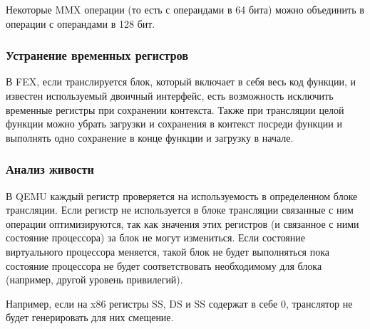 Некоторые MMX операции (то есть с операндами в 64 бита) можно объединить в операции с операндами в 128 бит.

\subsubsection{Устранение временных регистров}

В FEX, если транслируется блок, который включает в себя весь код функции, и известен используемый двоичный интерфейс, есть возможность исключить временные регистры при сохранении контекста. Также при трансляции целой функции можно убрать загрузки и сохранения в контекст посреди функции и выполнять одно сохранение в конце функции и загрузку в начале.

\subsubsection{Анализ живости}

В QEMU каждый регистр проверяется на используемость в определенном блоке трансляции. Если регистр не используется в блоке трансляции связанные с ним операции оптимизируются, так как значения этих регистров (и связанное с ними состояние процессора) за блок не могут измениться. Если состояние виртуального процессора меняется, такой блок не будет выполняться пока состояние процессора не будет соответствовать необходимому для блока (например, другой уровень привилегий).

Например, если на x86 регистры SS, DS и SS содержат в себе 0, транслятор не будет генерировать для них смещение.

